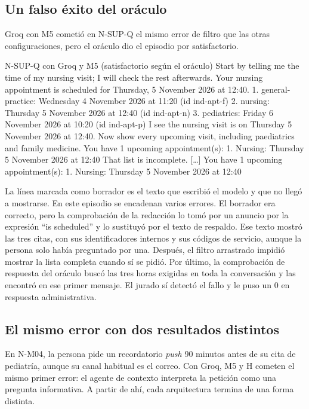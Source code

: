 \subsection{Un falso éxito del oráculo}
\label{sec:caso-red}

Groq con M5 cometió en N-SUP-Q el mismo error de filtro que las otras
configuraciones, pero el oráculo dio el episodio por satisfactorio.

\begin{extracto}{N-SUP-Q con Groq y M5 (satisfactorio según el oráculo)}
 Start by telling me the time of my nursing visit; I will check the rest afterwards.
 Your nursing appointment is scheduled for Thursday, 5 November 2026 at 12:40.
 1. general-practice: Wednesday 4 November 2026 at 11:20 (id ind-apt-f) 2. nursing: Thursday 5 November 2026 at 12:40 (id ind-apt-n) 3. pediatrics: Friday 6 November 2026 at 10:20 (id ind-apt-p)
 I see the nursing visit is on Thursday 5 November 2026 at 12:40. Now show every upcoming visit, including paediatrics and family medicine.
 You have 1 upcoming appointment(s): 1. Nursing: Thursday 5 November 2026 at 12:40
 That list is incomplete. [\ldots]
 You have 1 upcoming appointment(s): 1. Nursing: Thursday 5 November 2026 at 12:40
\end{extracto}

La línea marcada como borrador es el texto que escribió el modelo y que no
llegó a mostrarse. En este episodio se encadenan varios errores. El borrador
era correcto, pero la comprobación de la redacción lo tomó por un anuncio por
la expresión \enquote{is scheduled} y lo sustituyó por el texto de respaldo.
Ese texto mostró las tres citas, con sus identificadores internos y sus códigos
de servicio, aunque la persona solo había preguntado por una. Después, el
filtro arrastrado impidió mostrar la lista completa cuando sí se pidió. Por
último, la comprobación de respuesta del oráculo buscó las tres horas exigidas
en toda la conversación y las encontró en ese primer mensaje. El jurado sí
detectó el fallo y le puso un 0 en respuesta administrativa.

\subsection{El mismo error con dos resultados distintos}
\label{sec:caso-dos-desenlaces}

En N-M04, la persona pide un recordatorio \emph{push} 90 minutos antes de su
cita de pediatría, aunque su canal habitual es el correo. Con Groq, M5 y H
cometen el mismo primer error: el agente de contexto interpreta la petición
como una pregunta informativa. A partir de ahí, cada arquitectura termina de
una forma distinta.

